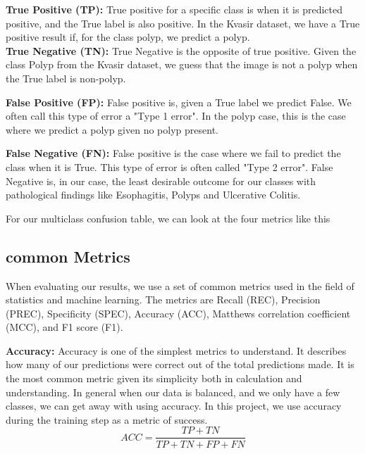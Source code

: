 \textbf{True Positive (TP): } True positive for a specific class is when it is predicted positive, and the True label is also positive.  In the Kvasir dataset, we have a True positive result if, for the class polyp, we predict a polyp.\\

\textbf{True Negative (TN): } True Negative is the opposite of true positive. Given the class Polyp from the Kvasir dataset, we guess that the image is not a polyp when the True label is non-polyp. 

\textbf{False Positive (FP): } False positive is, given a True label we predict False. We often call this type of error a "Type 1 error".   In the polyp case, this is the case where we predict a polyp given no polyp present.


\textbf{False Negative (FN): } False positive is the case where we fail to predict the class when it is True. This type of error is often called "Type 2 error". False Negative is, in our case, the least desirable outcome for our classes with pathological findings like Esophagitis, Polyps and Ulcerative Colitis.

For our multiclass confusion table, we can look at the four metrics like this


\subsection{common Metrics}
When evaluating our results, we use a set of common metrics used in the field of statistics and machine learning.  The metrics are Recall (REC), Precision (PREC), Specificity (SPEC), Accuracy (ACC), Matthews correlation coefficient (MCC), and F1 score (F1). 


\vspace{5px}
\textbf{Accuracy:}  Accuracy is one of the simplest metrics to understand. It describes how many of our predictions were correct out of the total predictions made. It is the most common metric given its simplicity both in calculation and understanding. 
In general when our data is balanced, and we only have a few classes, we can get away with using accuracy. 
In this project, we use accuracy during the training step as a metric of success.
 \begin{equation}
ACC=\frac{TP+TN}{TP+TN+FP+FN}
\end{equation}

